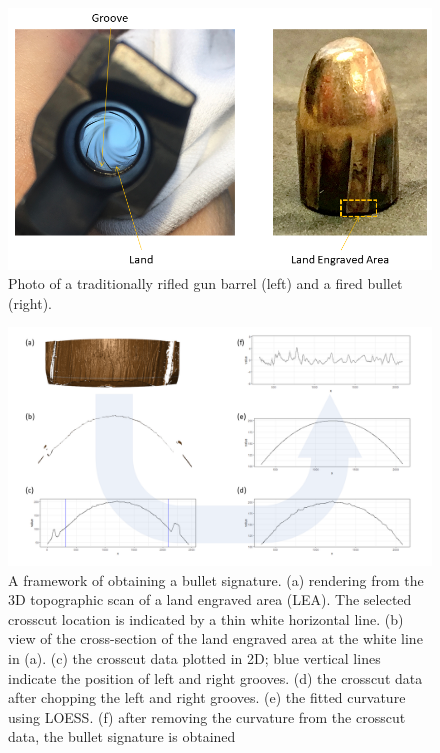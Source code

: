 \begin{Schunk}
\begin{figure}

{\centering \includegraphics[width=.8\textwidth]{ju-hofmann_files/figure-latex/barrel_bullet_ps} 

}

\caption[Photo of a traditionally rifled gun barrel (left) and a fired bullet (right)]{Photo of a traditionally rifled gun barrel (left) and a fired bullet (right).}\label{fig:bullet}
\end{figure}
\end{Schunk}

\begin{Schunk}
\begin{figure}

{\centering \includegraphics[width=.9\textwidth]{ju-hofmann_files/figure-latex/figure1_v2} 

}

\caption[A framework of obtaining a bullet signature]{A framework of obtaining a bullet signature. (a) rendering from the 3D topographic scan of a land engraved area (LEA). The selected crosscut location is indicated by a thin white horizontal line. (b) view of the cross-section of the land engraved area at the white line in (a). (c) the crosscut data plotted in 2D; blue vertical lines indicate the position of left and right grooves. (d) the crosscut data after chopping the left and right grooves. (e) the fitted curvature using LOESS. (f) after removing the curvature from the crosscut data, the bullet signature is obtained}\label{fig:process}
\end{figure}
\end{Schunk}

